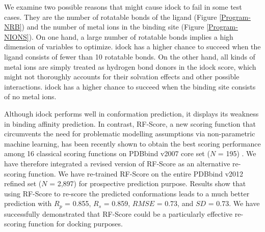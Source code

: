 \documentclass[10pt]{article}
\begin{document}
We examine two possible reasons that might cause idock to fail in some test cases. They are the number of rotatable bonds of the ligand (Figure \ref{Program-NRB}) and the number of metal ions in the binding site (Figure \ref{Program-NIONS}). On one hand, a large number of rotatable bonds implies a high dimension of variables to optimize. idock has a higher chance to succeed when the ligand consists of fewer than 10 rotatable bonds. On the other hand, all kinds of metal ions are simply treated as hydrogen bond donors in the idock score, which might not thoroughly accounts for their solvation effects and other possible interactions. idock has a higher chance to succeed when the binding site consists of no metal ions.

Although idock performs well in conformation prediction, it displays its weakness in binding affinity prediction. In contrast, RF-Score, a new scoring function that circumvents the need for problematic modelling assumptions via non-parametric machine learning, has been recently shown to obtain the best scoring performance among 16 classical scoring functions on PDBbind v2007 core set ($N$ = 195) \cite{564}. We have therefore integrated a revised version of RF-Score as an alternative re-scoring function. We have re-trained RF-Score on the entire PDBbind v2012 refined set ($N$ = 2,897) for prospective prediction purpose. Results show that using RF-Score to re-score the predicted conformations leads to a much better prediction with $R_p$ = 0.855, $R_s$ = 0.859, $RMSE$ = 0.73, and $SD$ = 0.73. We have successfully demonstrated that RF-Score could be a particularly effective re-scoring function for docking purposes.
\end{document}

